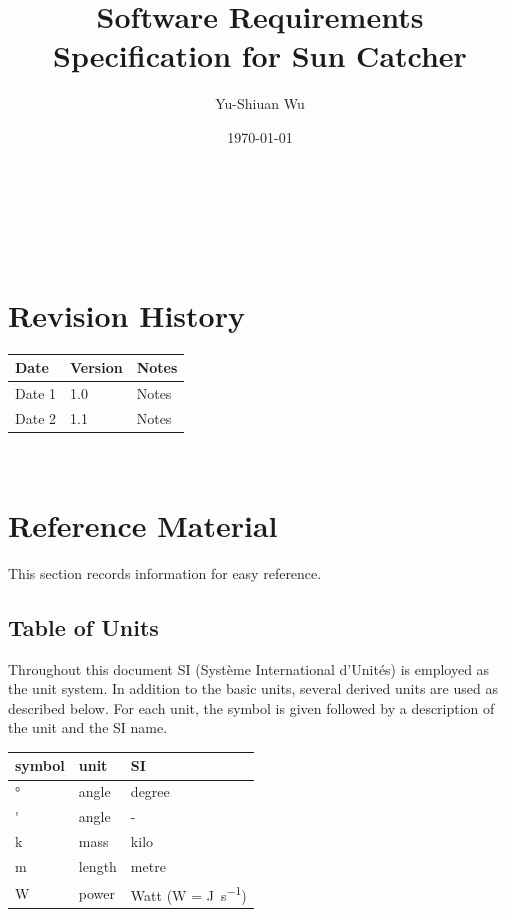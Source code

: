 \documentclass[12pt]{article}
\begin{document}
\title{Software Requirements Specification for Sun Catcher} 
\author{Yu-Shiuan Wu}
\date{\today}
	
\maketitle

~\newpage


\tableofcontents

~\newpage

\section*{Revision History}

\begin{tabularx}{\textwidth}{p{3cm}p{2cm}X}
\toprule {\bf Date} & {\bf Version} & {\bf Notes}\\
\midrule
Date 1 & 1.0 & Notes\\
Date 2 & 1.1 & Notes\\
\bottomrule
\end{tabularx}

~\newpage

\section{Reference Material}

This section records information for easy reference.

\subsection{Table of Units}

Throughout this document SI (Syst\`{e}me International d'Unit\'{e}s) is employed
as the unit system.  In addition to the basic units, several derived units are
used as described below.  For each unit, the symbol is given followed by a
description of the unit and the SI name.
~\newline

\renewcommand{\arraystretch}{1.2}
  \noindent \begin{tabular}{l l l} 
    \toprule		
    \textbf{symbol} & \textbf{unit} & \textbf{SI}\\
    \midrule 
    \si{\degree} & angle & degree\\
    \si{'} & angle	& - \\
    \si{k} & mass   & kilo\\
    \si{m} &  length   & metre \\
    \si{\watt} & power & Watt (W = \si{\joule\per\second})\\
    \bottomrule
  \end{tabular}
\end{document}
